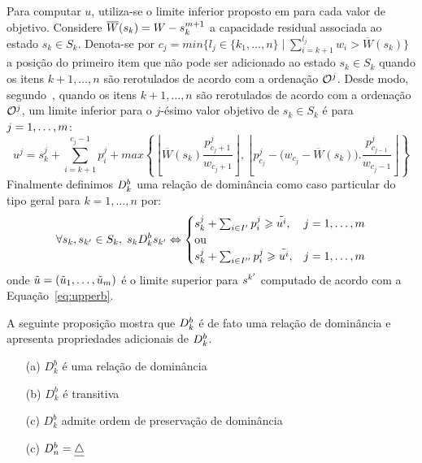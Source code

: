 Para computar $u$, utiliza-se o limite inferior proposto em
\cite{martello1990knapsack} para cada valor de objetivo.
Considere $\overline{W}(s_k) = W - s_k^{m+1}$ a capacidade residual associada
ao estado $s_k \in S_k$.
Denota-se por
$c_j = min\big\{l_j \in \{k_1, \ldots, n\} \; | \; \sum_{i=k+1}^{l_j} w_i > \overline{W}(s_k)\big\}$
a posição do primeiro item que não pode ser adicionado ao estado $s_k \in S_k$
quando os itens $k+1, \ldots, n$ são rerotulados de acordo com a ordenação $\mathcal{O}^j$.
Desde modo, segundo~\cite{martello1990knapsack}, quando os itens $k+1, \ldots, n$
são rerotulados de acordo com a ordenação $\mathcal{O}^j$, um limite inferior
para o $j$-ésimo valor objetivo de $s_k \in S_k$ é para $j = 1, \ldots, m$:
\begin{equation}
  u^j = s_k^j + \sum_{i=k+1}^{c_j-1} p_i^j +
    max\left\{ \left\lfloor\overline{W}(s_k)\frac{p^j_{c_j+1}}{w_{c_j+1}} \right\rfloor ,
     \left\lfloor p^j_{c_j} - \big(w_{c_j} - \overline{W}(s_k)\big).\frac{p^j_{c_{j-1}}}{w_{c_j-1}}
     \right\rfloor \right\}
  \label{eq:upperb}
\end{equation}
Finalmente definimos $D_k^{b}$ uma relação de dominância como caso particular
do tipo geral para $k = 1, \ldots, n$ por:
\begin{displaymath}
  \forall s_k, s_{{k'}} \in S_k, \; s_k D_k^{b} s_{{k'}}
    \Leftrightarrow
    \begin{cases}
      s_k^j + \sum_{i \in I'} p_i^j \geqslant \tilde{u^i}, & j = 1, \ldots, m \\
      \text{ou} \\
      s_k^j + \sum_{i \in I''} p_i^j \geqslant \tilde{u^i}, & j = 1, \ldots, m
    \end{cases}
\end{displaymath}
onde $\tilde{u} = (\tilde{u}_1, \ldots, \tilde{u}_m)$ é o limite superior
para $s^{{k'}}$ computado de acordo com a Equação~\ref{eq:upperb}.

A seguinte proposição mostra que $D_k^{b}$ é de fato uma relação de dominância
e apresenta propriedades adicionais de $D_k^{b}$.
\begin{myprop}[Relação $D_k^b$]
  \noindent
  \begin{enumerate}
    \item[(a)] $D_k^b$ é uma relação de dominância
    \item[(b)] $D_k^b$ é transitiva
    \item[(c)] $D_k^b$ admite ordem de preservação de dominância
    \item[(c)] $D_n^b = \underline{\triangle}$
\end{enumerate}
\end{myprop}

